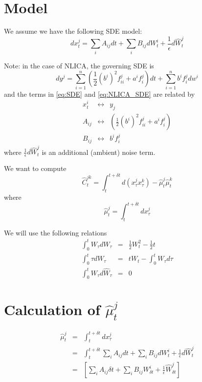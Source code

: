 \documentclass[12pt]{article}
\begin{document}
\section{Model}

We assume we have the following SDE model:
\begin{equation} \label{eq:SDE}
dx_t^j = \sum_i A_{ij} dt + \sum_i B_{ij} dW_t^i + \frac{1}{\epsilon} d\hat{W}_t^j
\end{equation}

Note: in the case of NLICA, the governing SDE is
\begin{equation} \label{eq:NLICA_SDE}
dy^j = \sum_{i=1}^n \left(\frac{1}{2} (b^i)^2 f_{ii}^j + a^i f_i^j\right) dt + \sum_{i=1}^n b^i f_i^j dw^i
\end{equation}
and the terms in \eqref{eq:SDE} and \eqref{eq:NLICA_SDE} are related by 
\begin{eqnarray}
x_t^i &\leftrightarrow &  y_j\\
A_{ij} &\leftrightarrow &  \left(\frac{1}{2} (b^i)^2 f_{ii}^j + a^i f_i^j\right)\\
B_{ij} &\leftrightarrow & b^i f_i^j 
\end{eqnarray}
where $\frac{1}{\epsilon} d\hat{W}_t^j$ is an additional (ambient) noise term.

We want to compute
\begin{equation}
\hat{C}_t^{jk} = \int_{t}^{t+\delta t} d(x_{\tau}^j x_{\tau}^k) - \hat{\mu}_t^j \hat{\mu}_t^k
\end{equation}
where
\begin{equation}
\hat{\mu}_t^j = \int_{t}^{t+\delta t} dx_{\tau}^j 
\end{equation}

We will use the following relations
\begin{eqnarray}
\int_0^t W_\tau dW_\tau	&=& \frac{1}{2} W_t^2 - \frac{1}{2} t \\
\int_0^t \tau dW_\tau &=& t W_t - \int_0^t W_\tau d \tau \\
\int_0^t W_\tau d \hat{W}_\tau &=& 0
\end{eqnarray}

\section{Calculation of $\hat{\mu}_t^j$}

\begin{eqnarray}
\hat{\mu}_t^j &=& \int_{t}^{t+\delta t} dx_{\tau}^j \\
&=& \int_{t}^{t+\delta t} \sum_i A_{ij} dt + \sum_i B_{ij} dW_t^i + \frac{1}{\epsilon} d\hat{W}_t^j \\
&=& \left[ \sum_i A_{ij} \delta t + \sum_i B_{ij} W_{\delta t}^i + \frac{1}{\epsilon} \hat{W}_{\delta t}^j \right]
\end{eqnarray}
\end{document}
